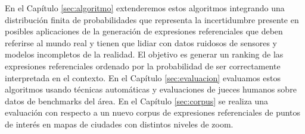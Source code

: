 En el Cap\'itulo \ref{sec:algoritmo} extenderemos estos algoritmos integrando una distribuci\'on finita de probabilidades que representa la incertidumbre presente en posibles aplicaciones de la generaci\'on de expresiones referenciales que deben referirse al mundo real y tienen que lidiar con datos ruidosos de sensores y modelos incompletos de la realidad. El objetivo es generar un ranking de las expresiones referenciales ordenado por la probabilidad de ser correctamente interpretada en el contexto. En el Cap\'itulo \ref{sec:evaluacion} evaluamos estos algoritmos usando t\'ecnicas autom\'aticas y evaluaciones de jueces humanos sobre datos de benchmarks del \'area. En el Cap\'itulo \ref{sec:corpus} se realiza una evaluaci\'on con respecto a un nuevo corpus de expresiones referenciales de puntos de inter\'es en mapas de ciudades con distintos niveles de zoom. 


